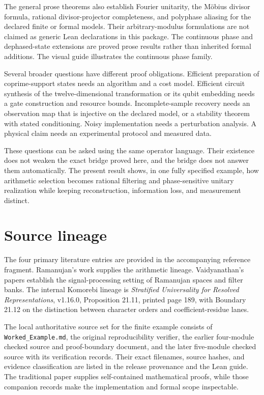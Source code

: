 The general prose theorems also establish Fourier unitarity, the Möbius
divisor formula, rational divisor-projector completeness, and polyphase
aliasing for the declared finite or formal models. Their
arbitrary-modulus formulations are not claimed as generic Lean
declarations in this package. The continuous phase and dephased-state
extensions are proved prose results rather than inherited formal
additions. The visual guide illustrates the continuous phase family.

Several broader questions have different proof obligations. Efficient
preparation of coprime-support states needs an algorithm and a cost
model. Efficient circuit synthesis of the twelve-dimensional
transformation or its qubit embedding needs a gate construction and
resource bounds. Incomplete-sample recovery needs an observation map
that is injective on the declared model, or a stability theorem with
stated conditioning. Noisy implementation needs a perturbation analysis.
A physical claim needs an experimental protocol and measured data.

These questions can be asked using the same operator language. Their
existence does not weaken the exact bridge proved here, and the bridge
does not answer them automatically. The present result shows, in one
fully specified example, how arithmetic selection becomes rational
filtering and phase-sensitive unitary realization while keeping
reconstruction, information loss, and measurement distinct.

\hypertarget{source-lineage}{%
\section{Source lineage}\label{source-lineage}}

The four primary literature entries are provided in the accompanying
reference fragment. Ramanujan's work supplies the arithmetic lineage.
Vaidyanathan's papers establish the signal-processing setting of
Ramanujan spaces and filter banks. The internal Komorebi lineage is
\emph{Stratified Universality for Resolved Representations}, v1.16.0,
Proposition 21.11, printed page 189, with Boundary 21.12 on the
distinction between character orders and coefficient-residue lanes.

The local authoritative source set for the finite example consists of
\texttt{Worked\_Example.md}, the original reproducibility verifier, the
earlier four-module checked source and proof-boundary document, and the
later five-module checked source with its verification records. Their
exact filenames, source hashes, and evidence classification are listed
in the release provenance and the Lean guide. The traditional paper
supplies self-contained mathematical proofs, while those companion
records make the implementation and formal scope inspectable.


